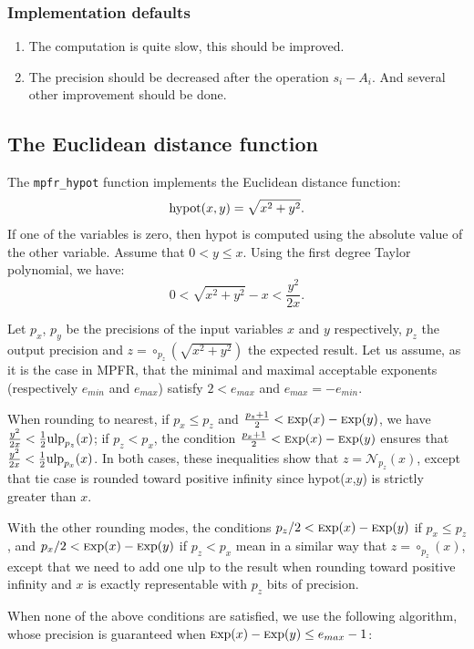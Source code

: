 \documentclass[12pt]{amsart}
\def\ulp{{\rm ulp}}
\def\Exp{{\rm \textsc exp}}
\def\N{{\mathcal N}}
\begin{document}
\subsubsection{Implementation defaults}
\begin{enumerate}
\item The computation is quite slow, this should be improved.
\item The precision should be decreased after the operation $s_i-A_i$. And several other improvement should be done.
\end{enumerate}

\subsection{The Euclidean distance function}

The \texttt{mpfr\_hypot} function implements the Euclidean distance function:
\[
\textnormal{hypot} (x,y) = \sqrt{x^2+y^2}.
\]
If one of the variables is zero, then hypot is computed using the absolute
value of the other variable.  Assume that $0 < y \leq x$. Using the first
degree Taylor polynomial, we have:
\[
0 < \sqrt{x^2+y^2}-x < \frac{y^2}{2x}.
\]

Let $p_x$, $p_y$ be the precisions of the input variables $x$ and $y$
respectively, $p_z$ the output precision and $z=\circ_{p_z}(\sqrt{x^2+y^2})$
the expected result.  Let us assume, as it is the case in MPFR, that
the minimal and maximal acceptable exponents (respectively $e_{min}$
and $e_{max}$) satisfy $2 < e_{max}$ and $e_{max} = -e_{min}$.

When rounding to nearest, if $p_x \leq p_z$ and $\frac{p_z+1}{2} < \Exp(x) -
\Exp(y)$, we have $\frac{y^2}{2x} < \frac{1}{2}\ulp_{p_z}(x)$; if $p_z <
p_x$, the condition $\frac{p_x+1}{2} < \Exp(x) - \Exp(y)$ ensures that
$\frac{y^2}{2x} < \frac{1}{2} \ulp_{p_x}(x)$.  In both cases, these
inequalities show that $z=\N_{p_z}(x)$, except that tie case is rounded
toward positive infinity since hypot($x$,$y$) is strictly greater than $x$.

With the other rounding modes, the conditions $p_z/2 < \Exp(x) - \Exp(y)$
if $p_x \leq p_z$, and $p_x/2 < \Exp(x) - \Exp(y)$ if $p_z < p_x$ mean in
a similar way that $z=\circ_{p_z}(x)$, except that we need to add one ulp
to the result when rounding toward positive infinity and $x$ is exactly
representable with $p_z$ bits of precision.

When none of the above conditions are satisfied, we use the following
algorithm, whose precision is guaranteed when
$\Exp(x) - \Exp(y) \leq e_{max} - 1$:
\end{document}
